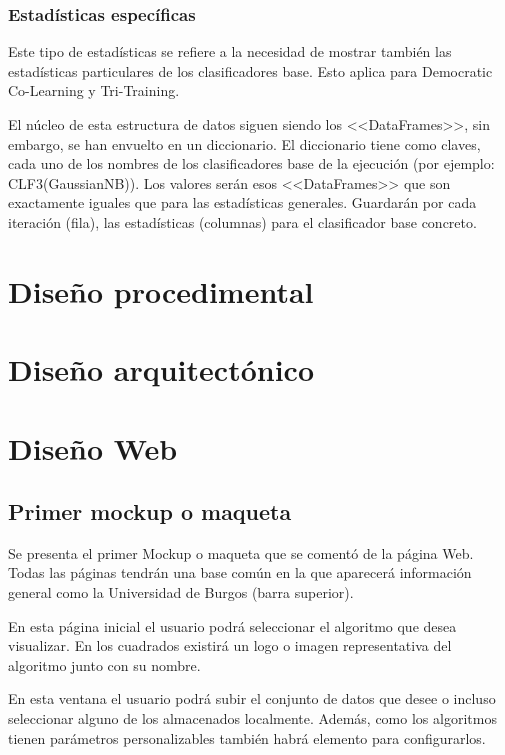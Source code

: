 \subsubsection{Estadísticas específicas}
Este tipo de estadísticas se refiere a la necesidad de mostrar también las
estadísticas particulares de los clasificadores base. Esto aplica para
Democratic Co-Learning y Tri-Training.

El núcleo de esta estructura de datos siguen siendo los <<DataFrames>>, sin
embargo, se han envuelto en un diccionario. El diccionario tiene como claves,
cada uno de los nombres de los clasificadores base de la ejecución (por ejemplo:
CLF3(GaussianNB)). Los valores serán esos <<DataFrames>> que son exactamente
iguales que para las estadísticas generales. Guardarán por cada iteración
(fila), las estadísticas (columnas) para el clasificador base concreto.

\section{Diseño procedimental}


\section{Diseño arquitectónico}

\section{Diseño Web}

\subsection{Primer mockup o maqueta}
Se presenta el primer Mockup o maqueta que se comentó de la página Web. Todas
las páginas tendrán una base común en la que aparecerá información general como
la Universidad de Burgos (barra superior).


En esta página inicial el usuario podrá seleccionar el algoritmo que desea
visualizar. En los cuadrados existirá un logo o imagen representativa del
algoritmo junto con su nombre.


En esta ventana el usuario podrá subir el conjunto de datos que desee o incluso
seleccionar alguno de los almacenados localmente. Además, como los algoritmos
tienen parámetros personalizables también habrá elemento para configurarlos.

